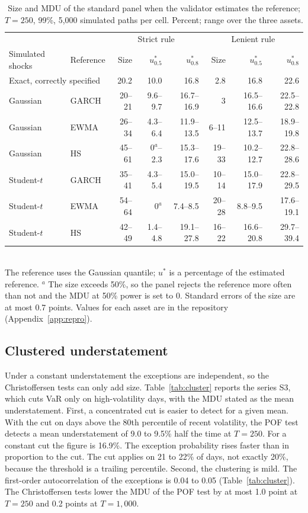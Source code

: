 \documentclass[11pt]{article}
\begin{document}
\begin{table}[tbp]
\caption{Size and MDU of the standard panel when the validator estimates the
reference; $T = 250$, 99\%, 5,000 simulated paths per cell. Percent; range over
the three assets.}
\label{tab:estref}
\small
\centering
\setlength{\tabcolsep}{3pt}
\begin{tabular}{llrrrrrr}
\toprule
 & & \multicolumn{3}{c}{Strict rule} & \multicolumn{3}{c}{Lenient rule} \\
Simulated shocks & Reference & Size & $u^*_{0.5}$ & $u^*_{0.8}$ & Size & $u^*_{0.5}$ & $u^*_{0.8}$ \\
\midrule
\multicolumn{2}{l}{Exact, correctly specified} & 20.2 & 10.0 & 16.8 & 2.8 & 16.8 & 22.6 \\
Gaussian & GARCH & 20--21 & 9.6--9.7 & 16.7--16.9 & 3 & 16.5--16.6 & 22.5--22.8 \\
Gaussian & EWMA & 26--34 & 4.3--6.4 & 11.9--13.5 & 6--11 & 12.5--13.7 & 18.9--19.8 \\
Gaussian & HS & 45--61 & $0^{a}$--2.3 & 15.3--17.6 & 19--33 & 10.2--12.7 & 22.8--28.6 \\
Student-$t$ & GARCH & 35--41 & 4.3--5.4 & 15.0--19.5 & 10--14 & 15.0--17.9 & 22.8--29.5 \\
Student-$t$ & EWMA & 54--64 & $0^{a}$ & 7.4--8.5 & 20--28 & 8.8--9.5 & 17.6--19.1 \\
Student-$t$ & HS & 42--49 & 1.4--4.8 & 19.1--27.8 & 16--22 & 16.6--20.8 & 29.7--39.4 \\
\bottomrule
\end{tabular}
\\[2pt]
\footnotesize The reference uses the Gaussian quantile; $u^*$ is a percentage of the estimated reference. $^{a}$ The size exceeds 50\%, so the panel rejects the reference more often than not and the MDU at 50\% power is set to 0. Standard errors of the size are at most 0.7 points. Values for each asset are in the repository (Appendix~\ref{app:repro}).
\end{table}

\subsection{Clustered understatement}
\label{sec:cluster}

Under a constant understatement the exceptions are independent, so the
Christoffersen tests can only add size. Table~\ref{tab:cluster} reports the
series S3, which cuts VaR only on high-volatility days, with the MDU stated as
the mean understatement. First, a concentrated cut is easier to detect for a
given mean. With the cut on days above the 80th percentile of recent
volatility, the POF test detects a mean understatement of 9.0 to 9.5\% half
the time at $T = 250$. For a constant cut the figure is 16.9\%. The
exception probability rises faster than in proportion to the cut. The cut
applies on 21 to 22\% of days, not exactly 20\%, because the threshold is a
trailing percentile. Second, the clustering
is mild. The first-order autocorrelation of the exceptions is 0.04 to 0.05
(Table~\ref{tab:cluster}). The Christoffersen tests lower the MDU of the POF
test by at most 1.0 point at $T = 250$ and 0.2 points at $T = 1{,}000$.
\end{document}
